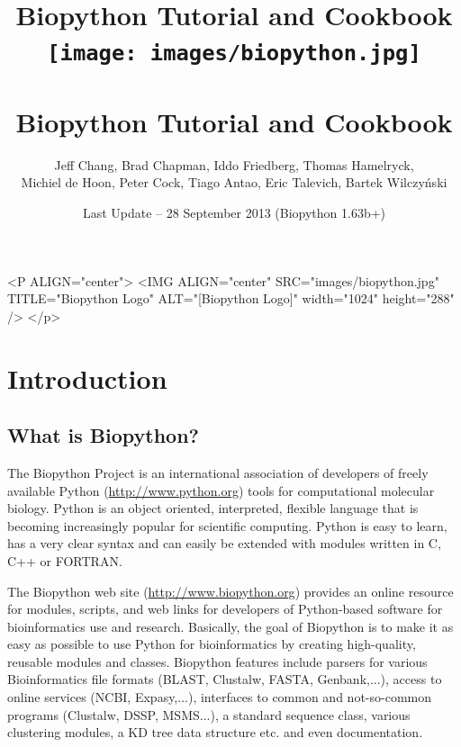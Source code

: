 \documentclass{report}
\begin{document}
\begin{htmlonly}
\title{Biopython Tutorial and Cookbook}
\end{htmlonly}
\begin{latexonly}
\title{
\texttt{[image: images/biopython.jpg]}\\
~\\
Biopython Tutorial and Cookbook}
\end{latexonly}

\author{Jeff Chang, Brad Chapman, Iddo Friedberg, Thomas Hamelryck, \\
Michiel de Hoon, Peter Cock, Tiago Antao, Eric Talevich, Bartek Wilczy\'{n}ski}
\date{Last Update -- 28 September 2013 (Biopython 1.63b+)}

\begin{rawhtml}
<P ALIGN="center">
<IMG ALIGN="center" SRC="images/biopython.jpg" TITLE="Biopython Logo" ALT="[Biopython Logo]" width="1024" height="288" />
</p>
\end{rawhtml}

\maketitle
\tableofcontents

\chapter{Introduction}
\label{chapter:introduction}

\section{What is Biopython?}

The Biopython Project is an international association of developers of freely available Python (\url{http://www.python.org}) tools for computational molecular biology. Python is an object oriented, interpreted, flexible language that is becoming increasingly popular for scientific computing. Python is easy to learn, has a very clear syntax and can easily be extended with modules written in C, C++ or FORTRAN.

The Biopython web site (\url{http://www.biopython.org}) provides
an online resource for modules, scripts, and web links for developers
of Python-based software for bioinformatics use and research. Basically,
the goal of Biopython is to make it as easy as possible to use Python
for bioinformatics by creating high-quality, reusable modules and
classes. Biopython features include parsers for various Bioinformatics
file formats (BLAST, Clustalw, FASTA, Genbank,...), access to online
services (NCBI, Expasy,...), interfaces to common and not-so-common
programs (Clustalw, DSSP, MSMS...), a standard sequence class, various
clustering modules, a KD tree data structure etc. and even documentation. 
\end{document}
